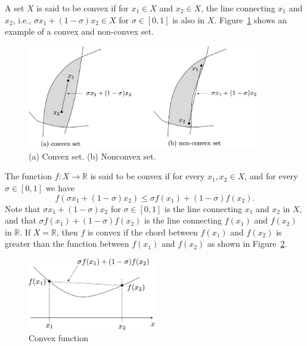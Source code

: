 \documentclass{article}
\begin{document}
A set $X$ is said to be convex if for $x_1\in X$ and $x_2\in X$, the line connecting $x_1$ and $x_2$, i.e., $\sigma x_1 + (1-\sigma)x_2\in X$ for $\sigma\in[0, 1]$ is also in $X$.  Figure~\ref{fig:convex_set} shows an example of a convex and non-convex set.
\begin{figure}[hbt]
  \centering
  \includegraphics[width=0.9\textwidth]{figures/convex_set}
  \caption{(a) Convex set.  (b) Nonconvex set.}
  \label{fig:convex_set}
\end{figure}

The function $f:X\to \mathbb{R}$ is said to be convex if for every $x_1, x_2\in X$, and for every $\sigma\in[0, 1]$ we have
\[
f(\sigma x_1 + (1-\sigma)x_2) \leq \sigma f(x_1) + (1-\sigma)f(x_2).
\]
Note that $\sigma x_1 + (1-\sigma)x_2$ for $\sigma\in[0, 1]$ is the line connecting $x_1$ and $x_2$ in $X$, and that $\sigma f(x_1) + (1-\sigma)f(x_2)$ is the line connecting $f(x_1)$ and $f(x_2)$ in $\mathbb{R}$.  If $X=\mathbb{R}$, then $f$ is convex if the chord between $f(x_1)$ and $f(x_2)$ is greater than the function between $f(x_1)$ and $f(x_2)$ as shown in Figure~\ref{fig:convex_function}.
\begin{figure}[hbt]
  \centering
  \includegraphics[width=0.5\textwidth]{figures/convex_function}
  \caption{Convex function}
  \label{fig:convex_function}
\end{figure}
\end{document}
